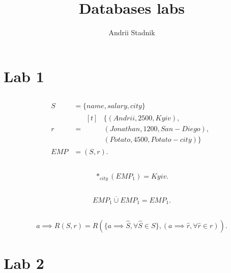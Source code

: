 \documentclass[a4paper]{article}
\title{Databases labs}
\author{Andrii Stadnik}
\begin{document}
\maketitle
\tableofcontents
\section{Lab 1}
\subsection{}
\begin{align*}
    S &= \{name, salary, city\} \\
    r &=
    \begin{aligned}[t]
            &\{(Andrii, 2500, Kyiv), \\
            &(Jonathan, 1200, San-Diego), \\
            &(Potato, 4500, Potato-city)\}
    \end{aligned} \\
    EMP &= (S, r)
.\end{align*}
\subsection{}
\[
    *_{city}(EMP_1) = Kyiv
.\]
\subsection{}
\[
    EMP_1 \overline{\cup} EMP_1 = EMP_1
.\]
\subsection{}
\[
    a \implies R(S, r) = R(\{a \implies \hat{S}, \forall \hat{S} \in S\}, (a \implies
    \hat{r}, \forall \hat{r} \in r))
.\]
\section{Lab 2}
\end{document}
